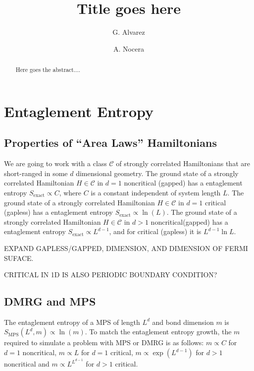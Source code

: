 \documentclass[showpacs,preprintnumbers,prb]{revtex4}
\begin{document}
\title{Title goes here}
\author{G. Alvarez}

\author{A. Nocera}

\begin{abstract}
Here goes the abstract....
\end{abstract}

\maketitle
\section{Entaglement Entropy}

\subsection{Properties of ``Area Laws'' Hamiltonians}
We are going to work with a class $\mathcal{C}$ of strongly correlated Hamiltonians that
are short-ranged in some $d$ dimensional geometry.
The ground state of a strongly correlated 
Hamiltonian $H\in\mathcal{C}$ in $d=1$ noncritical (gapped) has a entaglement entropy 
$S_\text{exact} \propto C$, where $C$ is a constant independent of system length $L$. 
The ground state of a strongly correlated  Hamiltonian $H\in\mathcal{C}$ 
 in $d=1$ critical (gapless) has a entaglement entropy 
$S_\text{exact} \propto \ln(L)$.
The ground state of a strongly correlated  Hamiltonian $H\in\mathcal{C}$
in $d>1$ noncritical(gapped) has a entaglement entropy 
$S_\text{exact} \propto L^{d-1}$, and for critical (gapless) it is $L^{d-1}\ln{L}$.

EXPAND GAPLESS/GAPPED, DIMENSION, AND DIMENSION OF FERMI SUFACE.
 
CRITICAL IN 1D IS ALSO PERIODIC BOUNDARY CONDITION?

\subsection{DMRG and MPS}
The entaglement entropy of a MPS of length $L^d$ and bond dimension $m$
is $S_\text{MPS}(L^d,m) \propto \ln(m)$. 
To match the entaglement entropy growth, the $m$ required to simulate a problem 
with MPS or DMRG is as follows: $m\propto C$ for $d=1$ noncritical, $m\propto L$ for
$d=1$ critical, $m\propto \exp(L^{d-1})$ for $d>1$ noncritical and
$m\propto L^{L^{d-1}}$ for $d>1$ critical.
\end{document}

